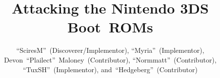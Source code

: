 \documentclass[journal]{IEEEtran}
\begin{document}
%
\title{Attacking the Nintendo 3DS Boot~ROMs}
%
%
%

\author{``SciresM''~{\relax(Discoverer/Implementor)},
        ``Myria''~{\relax(Implementor)}, 
        Devon~``Plailect''~Maloney~{\relax(Contributor)}, 
        ``Normmatt''~{\relax(Contributor)}, 
        ``TuxSH''~{\relax(Implementor)}, 
        and~``Hedgeberg''~{\relax(Contributor)}
        \vspace{-2.0em}}

% 
%

\maketitle
\end{document}
